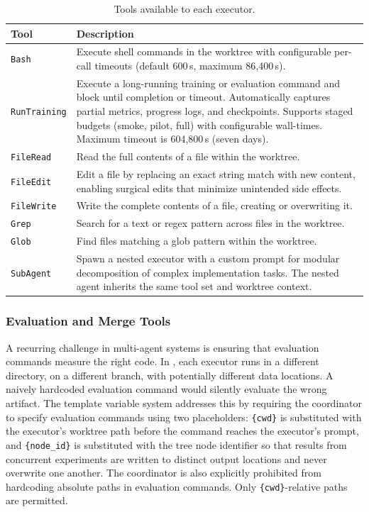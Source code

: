 \begin{table}[!htbp]
\centering
\small
\setlength{\tabcolsep}{4pt}
\renewcommand{\arraystretch}{1.08}
\caption{Tools available to each executor.}
\label{tab:sub-agent-tools}
\begin{tabularx}{\linewidth}{>{\raggedright\arraybackslash}p{2.8cm}>{\raggedright\arraybackslash}X}
\toprule
\textbf{Tool} & \textbf{Description} \\
\midrule
\texttt{Bash} & Execute shell commands in the worktree with configurable per-call timeouts (default 600\,s, maximum 86{,}400\,s). \\
\texttt{RunTraining} & Execute a long-running training or evaluation command and block until completion or timeout. Automatically captures partial metrics, progress logs, and checkpoints. Supports staged budgets (smoke, pilot, full) with configurable wall-times. Maximum timeout is 604{,}800\,s (seven days). \\
\texttt{FileRead} & Read the full contents of a file within the worktree. \\
\texttt{FileEdit} & Edit a file by replacing an exact string match with new content, enabling surgical edits that minimize unintended side effects. \\
\texttt{FileWrite} & Write the complete contents of a file, creating or overwriting it. \\
\texttt{Grep} & Search for a text or regex pattern across files in the worktree. \\
\texttt{Glob} & Find files matching a glob pattern within the worktree. \\
\texttt{SubAgent} & Spawn a nested executor with a custom prompt for modular decomposition of complex implementation tasks. The nested agent inherits the same tool set and worktree context. \\
\bottomrule
\end{tabularx}
\end{table}

\subsubsection{Evaluation and Merge Tools}
\label{app:evaluation-merge-tools}

A recurring challenge in multi-agent systems is ensuring that evaluation
commands measure the right code. In \arbor{}, each executor runs in a
different directory, on a different branch, with potentially different data
locations. A naively hardcoded evaluation command would silently evaluate
the wrong artifact. The template variable system addresses this by requiring
the coordinator to specify evaluation commands using two placeholders:
\texttt{\{cwd\}} is substituted with the executor's worktree path before
the command reaches the executor's prompt, and \texttt{\{node\_id\}} is
substituted with the tree node identifier so that results from concurrent
experiments are written to distinct output locations and never overwrite
one another. The coordinator is also explicitly prohibited from hardcoding
absolute paths in evaluation commands. Only \texttt{\{cwd\}}-relative
paths are permitted.

